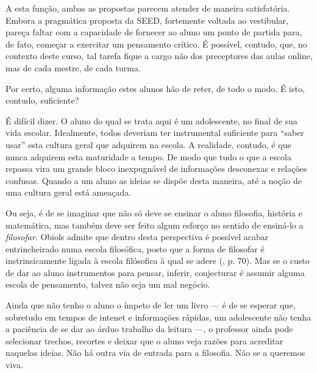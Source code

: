\documentclass[12pt,a4paper]{article}
\begin{document}
	A esta função, ambas as propostas parecem atender de maneira 
	satisfatória. Embora a pragmática proposta da SEED, fortemente 
	voltada ao vestibular, pareça faltar com a capacidade de 
	fornecer ao aluno um ponto de partida para, de fato, começar a 
	exercitar um pensamento crítico. É possível, contudo, que, no 
	contexto deste curso, tal tarefa fique a cargo não dos preceptores 
	das aulas online, mas de cada mestre, de cada turma. 

	Por certo, alguma informação estes alunos hão de reter, de todo o 
	modo. É isto, contudo, suficiente? 
	
	É difícil dizer. O aluno do qual se trata aqui é um adolescente, no final 
	de sua vida escolar. Idealmente, todos deveriam ter instrumental 
	suficiente para ``saber usar'' esta cultura geral que adquirem na escola. 
	A realidade, contudo, é que nunca adquirem esta maturidade a tempo. De 
	modo que tudo o que a escola repassa vira um grande bloco inexpugnável de 
	informações desconexas e relações confusas. Quando a um aluno as ideias 
	se dispõe desta maneira, até a noção de uma cultura geral está ameaçada. 
	
	Ou seja, é de se imaginar que não só deve se ensinar o aluno filosofia, 
	história e matemática, mas também deve ser feito algum esforço no sentido 
	de ensiná-lo a \textit{filosofar}. Obiols admite que dentro desta 
	perspectiva é possível acabar entrincheirado numa escola filosófica, posto 
	que a forma de filosofar é instrinsicamente ligada à escola filósofica à 
	qual se adere (\cite{obiols}, p. 70). Mas se o custo de dar ao aluno 
	instrumentos para pensar, inferir, conjecturar é assumir alguma escola 
	de pensamento, talvez não seja um mal negócio. 
	



	Ainda que não tenho o aluno o ímpeto de ler um livro --- é de se 
	esperar que, sobretudo em tempos de intenet e informações rápidas, 
	um adolescente não tenha a paciência de se dar ao árduo trabalho da 
	leitura ---, o professor ainda pode selecionar trechos, recortes 
	e deixar que o aluno veja razões para acreditar naquelas ideias. 
	Não há outra via de entrada para a filosofia. Não se a queremos viva. 
	
\end{document}
